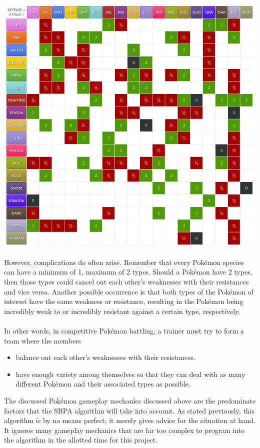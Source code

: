 \documentclass{article}
\begin{document}
\begin{center}
	\includegraphics[width=\textwidth]{typeChart.png}
\end{center}
However, complications do often arise. Remember that every Pok\'emon species can have a minimum of 1, maximum of 2 types. Should a Pok\'emon have 2 types, then those types could cancel out each other's weaknesses with their resistances and vice versa. Another possible occurrence is that both types of the Pok\'emon of interest have the same weakness or resistance, resulting in the Pok\'emon being incredibly weak to or incredibly resistant against a certain type, respectively.\\\\
In other words, in competitive Pok\'emon battling, a trainer must try to form a team where the members
\begin{itemize}
	\item balance out each other's weaknesses with their resistances.
	\item have enough variety among themselves so that they can deal with as many different Pok\'emon and their associated types as possible.
\end{itemize}
The discussed Pok\'emon gameplay mechanics discussed above are the predominate factors that the SBPA algorithm will take into account. As stated previously, this algorithm is by no means perfect; it merely gives advice for the situation at hand. It ignores many gameplay mechanics that are far too complex to program into the algorithm in the allotted time for this project.
\end{document}
